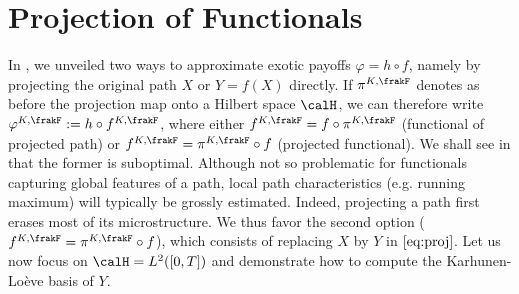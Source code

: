 \section{Projection of Functionals}
\label{sec:funcApprox}
In  , we unveiled two ways to approximate exotic payoffs $\varphi = h\circ f$, namely by projecting the original path $X$ or $Y = f(X)$ directly.  If $\pi^{K,\frakF}$ denotes as before the projection map onto a Hilbert space $\calH$, we can therefore write $\varphi^{K,\frakF} := h\circ f^{K,\frakF}$, where either $f^{K,\frakF} = f \circ \pi^{K,\frakF}$ (functional of projected path)
or $f^{K,\frakF} = \pi^{K,\frakF} \circ f$ (projected functional). 
We shall see in   that the former is suboptimal. 
Although not so problematic for functionals capturing global features of a path, local path characteristics (e.g. running maximum) will typically be grossly estimated. Indeed, projecting a path first erases most of its microstructure. 
We thus favor the second option ($f^{K,\frakF} = \pi^{K,\frakF} \circ f$), which consists of replacing $X$ by $Y$ in $\eqref{eq:proj}$. Let us now focus on $\calH = L^2([0,T])$ and demonstrate how to compute the Karhunen-Loève basis of $Y$. 



